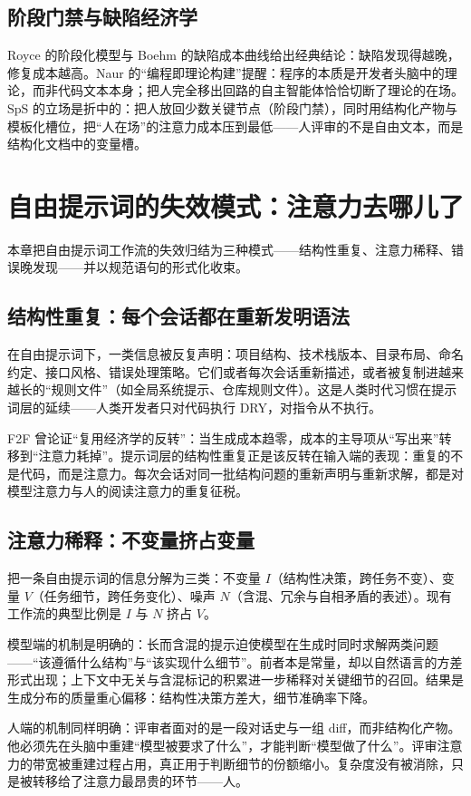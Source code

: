 \documentclass[11pt,a4paper]{ctexart}
\begin{document}
\subsection{阶段门禁与缺陷经济学}
Royce 的阶段化模型\cite{ref6}与 Boehm 的缺陷成本曲线\cite{ref7}给出经典结论：缺陷发现得越晚，修复成本越高。Naur 的“编程即理论构建”\cite{ref8}提醒：程序的本质是开发者头脑中的理论，而非代码文本本身；把人完全移出回路的自主智能体\cite{ref13}恰恰切断了理论的在场。SpS 的立场是折中的：把人放回少数关键节点（阶段门禁），同时用结构化产物与模板化槽位，把“人在场”的注意力成本压到最低——人评审的不是自由文本，而是结构化文档中的变量槽。

\section{自由提示词的失效模式：注意力去哪儿了}
本章把自由提示词工作流的失效归结为三种模式——结构性重复、注意力稀释、错误晚发现——并以规范语句的形式化收束。

\subsection{结构性重复：每个会话都在重新发明语法}
在自由提示词下，一类信息被反复声明：项目结构、技术栈版本、目录布局、命名约定、接口风格、错误处理策略。它们或者每次会话重新描述，或者被复制进越来越长的“规则文件”（如全局系统提示、仓库规则文件）。这是人类时代习惯在提示词层的延续——人类开发者只对代码执行 DRY，对指令从不执行。

F2F\cite{ref20} 曾论证“复用经济学的反转”：当生成成本趋零，成本的主导项从“写出来”转移到“注意力耗掉”。提示词层的结构性重复正是该反转在输入端的表现：重复的不是代码，而是注意力。每次会话对同一批结构问题的重新声明与重新求解，都是对模型注意力与人的阅读注意力的重复征税。

\subsection{注意力稀释：不变量挤占变量}
把一条自由提示词的信息分解为三类：不变量 $I$（结构性决策，跨任务不变）、变量 $V$（任务细节，跨任务变化）、噪声 $N$（含混、冗余与自相矛盾的表述）。现有工作流的典型比例是 $I$ 与 $N$ 挤占 $V$。

模型端的机制是明确的：长而含混的提示迫使模型在生成时同时求解两类问题——“该遵循什么结构”与“该实现什么细节”。前者本是常量，却以自然语言的方差形式出现；上下文中无关与含混标记的积累进一步稀释对关键细节的召回\cite{ref11}。结果是生成分布的质量重心偏移：结构性决策方差大，细节准确率下降。

人端的机制同样明确：评审者面对的是一段对话史与一组 diff，而非结构化产物。他必须先在头脑中重建“模型被要求了什么”，才能判断“模型做了什么”。评审注意力的带宽\cite{ref8,ref9}被重建过程占用，真正用于判断细节的份额缩小。复杂度没有被消除，只是被转移给了注意力最昂贵的环节——人。
\end{document}
